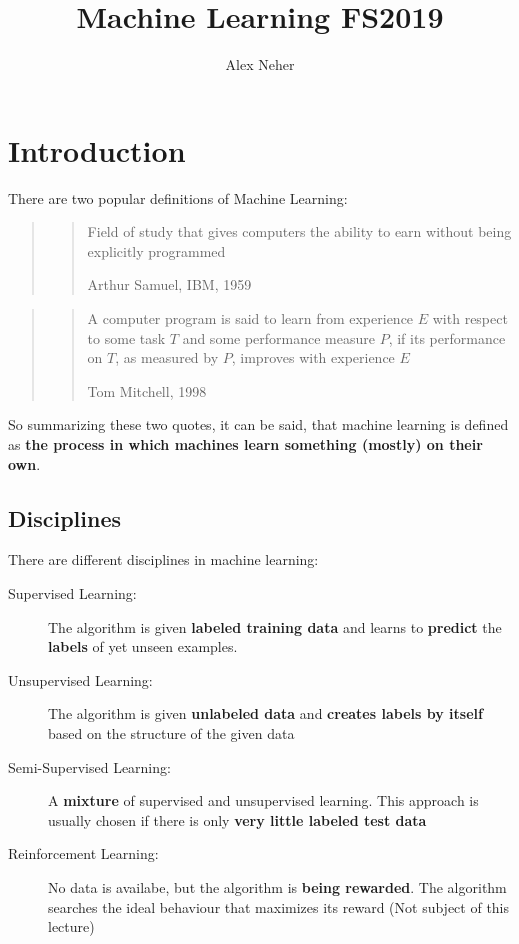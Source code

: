 \documentclass[a4paper, 11pt]{article}
\begin{document}
\title{Machine Learning FS2019}
\author{Alex Neher}
\maketitle

\tableofcontents

\newpage
\graphicspath{{./Pictures/}}

\restoregeometry

\section{Introduction}

There are two popular definitions of Machine Learning:

\begin{centering}
    \begin{quote}
        \blockquote[Arthur Samuel, IBM, 1959]{Field of study that gives computers the ability to earn without being explicitly programmed}
    \end{quote}

    \begin{quote}
        \blockquote[Tom Mitchell, 1998]{A computer program is said to learn from experience $E$ with respect to some task $T$ and some performance measure $P$, if its performance on $T$, as measured by $P$, improves with experience $E$}
    \end{quote}
\end{centering}

So summarizing these two quotes, it can be said, that machine learning is defined as \textbf{the process in which machines learn something (mostly) on their own}.

\subsection{Disciplines}

There are different disciplines in machine learning:

\begin{description}
    \item[Supervised Learning: ] The algorithm is given \textbf{labeled training data} and learns to \textbf{predict} the \textbf{labels} of yet unseen examples.
    \item[Unsupervised Learning: ] The algorithm is given \textbf{unlabeled data} and \textbf{creates labels by itself} based on the structure of the given data
    \item[Semi-Supervised Learning: ] A \textbf{mixture} of supervised and unsupervised learning. This approach is usually chosen if there is only \textbf{very little labeled test data}
    \item[Reinforcement Learning: ] No data is availabe, but the algorithm is \textbf{being rewarded}. The algorithm searches the ideal behaviour that maximizes its reward (Not subject of this lecture)
\end{description}
\end{document}
